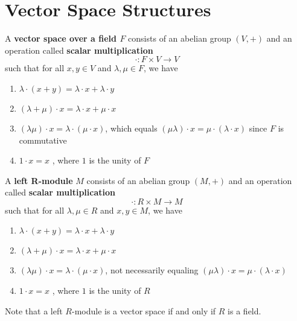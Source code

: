 \section{Vector Space Structures}

  \begin{definition}
     A \textbf{vector space over a field $F$} consists of an abelian group $(V, +)$ and an operation called \textbf{scalar multiplication} 
     \begin{equation}
       \cdot: F \times V \rightarrow V
     \end{equation}
    such that for all $x, y\in V$ and $\lambda, \mu \in F$, we have 
    \begin{enumerate}
      \item $\lambda \cdot (x + y) = \lambda \cdot x + \lambda \cdot y$
      \item $(\lambda + \mu) \cdot x = \lambda \cdot x + \mu \cdot x$ 
      \item $(\lambda \mu) \cdot x = \lambda \cdot (\mu \cdot x )$, which equals $(\mu \lambda) \cdot x = \mu \cdot (\lambda \cdot x)$ since $F$ is commutative 
      \item $1 \cdot x = x$ , where $1$ is the unity of $F$
    \end{enumerate}
  \end{definition}

  \begin{definition}
    A \textbf{left R-module} $M$ consists of an abelian group $(M, +)$ and an operation called \textbf{scalar multiplication}
    \begin{equation}
      \cdot: R \times M \longrightarrow M
    \end{equation}
    such that for all $\lambda, \mu \in R$ and $x, y \in M$, we have 
    \begin{enumerate}
      \item $\lambda \cdot (x + y) = \lambda \cdot x + \lambda \cdot y$
      \item $(\lambda + \mu) \cdot x = \lambda \cdot x + \mu \cdot x$ 
      \item $(\lambda \mu) \cdot x = \lambda \cdot (\mu \cdot x )$, not necessarily equaling $(\mu \lambda) \cdot x = \mu \cdot (\lambda \cdot x)$
      \item $1 \cdot x = x$ , where $1$ is the unity of $R$
    \end{enumerate}
    Note that a left $R$-module is a vector space if and only if $R$ is a field.
  \end{definition}

